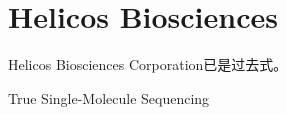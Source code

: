 \chapter{Helicos Biosciences}

Helicos Biosciences Corporation已是过去式。

True Single-Molecule Sequencing